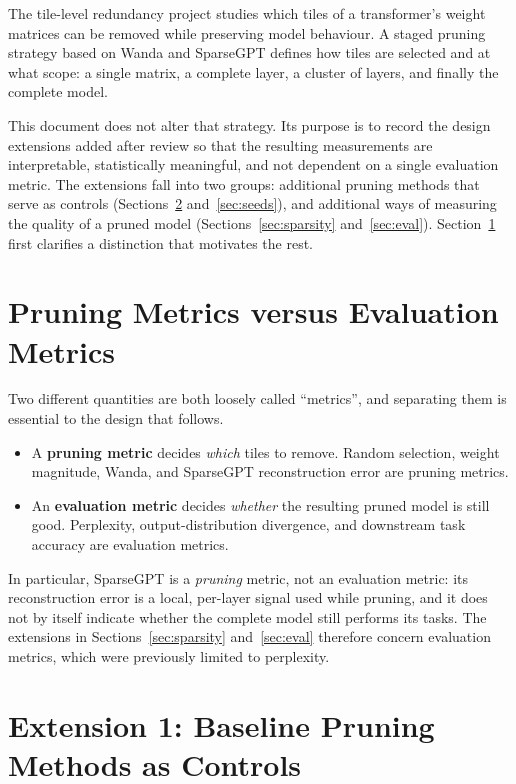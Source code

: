 \documentclass[11pt]{article}
\begin{document}
The tile-level redundancy project studies which tiles of a transformer's weight matrices can be removed
while preserving model behaviour. A staged pruning strategy based on Wanda and SparseGPT defines how
tiles are selected and at what scope: a single matrix, a complete layer, a cluster of layers, and finally
the complete model.

This document does not alter that strategy. Its purpose is to record the design extensions added after
review so that the resulting measurements are interpretable, statistically meaningful, and not dependent
on a single evaluation metric. The extensions fall into two groups: additional pruning methods that serve
as controls (Sections~\ref{sec:controls} and~\ref{sec:seeds}), and additional ways of measuring the
quality of a pruned model (Sections~\ref{sec:sparsity} and~\ref{sec:eval}). Section~\ref{sec:distinction}
first clarifies a distinction that motivates the rest.

\section{Pruning Metrics versus Evaluation Metrics}
\label{sec:distinction}

Two different quantities are both loosely called ``metrics'', and separating them is essential to the
design that follows.

\begin{itemize}
  \item A \textbf{pruning metric} decides \emph{which} tiles to remove. Random selection, weight
  magnitude, Wanda, and SparseGPT reconstruction error are pruning metrics.
  \item An \textbf{evaluation metric} decides \emph{whether} the resulting pruned model is still good.
  Perplexity, output-distribution divergence, and downstream task accuracy are evaluation metrics.
\end{itemize}

In particular, SparseGPT is a \emph{pruning} metric, not an evaluation metric: its reconstruction error
is a local, per-layer signal used while pruning, and it does not by itself indicate whether the complete
model still performs its tasks. The extensions in Sections~\ref{sec:sparsity} and~\ref{sec:eval}
therefore concern evaluation metrics, which were previously limited to perplexity.

\section{Extension 1: Baseline Pruning Methods as Controls}
\label{sec:controls}
\end{document}
